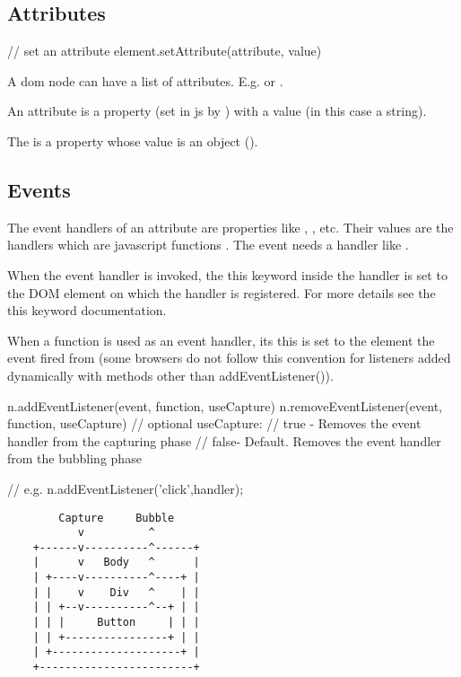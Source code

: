 \subsection{Attributes}


\begin{js}
  // set an attribute
  element.setAttribute(attribute, value)
\end{js}

A dom node can have a list of attributes. E.g.  or .

An attribute is a property (set in js by ) with
a value (in this case a string).

The  is a property whose value is an object
().


\vskip 3mm
\subsection{Events}

The event handlers of an attribute are properties like ,
, etc. Their values are the handlers which are javascript
functions . The event  needs a handler
like .


When the event handler is invoked, the this keyword inside the handler is set
to the DOM element on which the handler is registered. For more details see
the this keyword documentation.

When a function is used as an event handler, its this is set to the element
the event fired from (some browsers do not follow this convention for
listeners added dynamically with methods other than addEventListener()).

\begin{js}
  n.addEventListener(event, function, useCapture)
  n.removeEventListener(event, function, useCapture)
  // optional useCapture:
  //    true - Removes the event handler from the capturing phase
  //    false- Default. Removes the event handler from the bubbling phase

  // e.g.
  n.addEventListener('click',handler);
\end{js}


\begin{verbatim}
        Capture     Bubble
           v          ^
    +------v----------^------+
    |      v   Body   ^      |
    | +----v----------^----+ |
    | |    v    Div   ^    | |
    | | +--v----------^--+ | |
    | | |     Button     | | |
    | | +----------------+ | |
    | +--------------------+ |
    +------------------------+
\end{verbatim}

